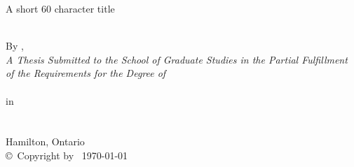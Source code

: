 \documentclass[
11pt, %
oneside, %
english, %
singlespacing, %
]{McMasterThesis} %
\author{xxxxxx xxxxx} %
\begin{document}
\frontmatter

\frontmatter %

\pagestyle{plain} %

\vspace{6cm}
\begin{center}
A short 60 character title %
\end{center}
\clearpage

\begin{center}

\vfill
\textsc{\Large \ttitle} \\

\vfill
By \authorname, \\%

 \vfill
{\large \textit{A Thesis Submitted to the School of Graduate Studies in the Partial Fulfillment of the Requirements for the Degree of}}\\

\vfill
{\large  \degreename}\\ \vspace{15pt}
{\large  in}\\ \vspace{15pt}
{\large  \subjectareaname}\\
\vfill
\vfill
{\large \univname\, \\ Hamilton, Ontario}\\[4cm] %


{\copyright\, Copyright by \authorname\, \today}\\[4cm] %

\end{center}
\end{document}
